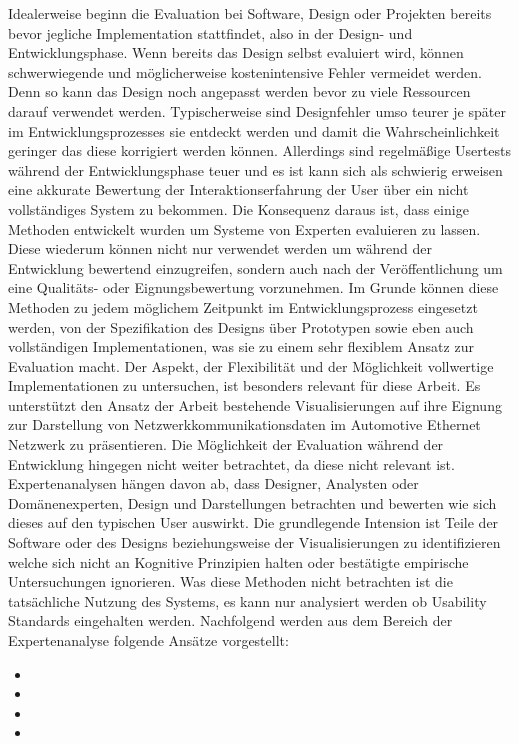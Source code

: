 \documentclass[draft=false
              ,paper=a4
              ,twoside=false
              ,fontsize=11pt
              ,headsepline
              ,BCOR10mm
              ,DIV11
              ]{scrbook}
\begin{document}
Idealerweise beginn die Evaluation bei Software, Design oder Projekten bereits bevor jegliche Implementation stattfindet, also in der Design- und Entwicklungsphase. Wenn bereits das Design selbst evaluiert wird, können schwerwiegende und möglicherweise kostenintensive Fehler vermeidet werden. Denn so kann das Design noch angepasst werden bevor zu viele Ressourcen darauf verwendet werden. Typischerweise sind Designfehler umso teurer je später im Entwicklungsprozesses sie entdeckt werden und damit die Wahrscheinlichkeit geringer das diese korrigiert werden können. Allerdings sind regelmäßige Usertests während der Entwicklungsphase teuer und es ist kann sich als schwierig erweisen eine akkurate Bewertung der Interaktionserfahrung der User über ein nicht vollständiges System zu bekommen. Die Konsequenz daraus ist, dass einige Methoden entwickelt wurden um Systeme von Experten evaluieren zu lassen. Diese wiederum können nicht nur verwendet werden um während der Entwicklung bewertend einzugreifen, sondern auch nach der Veröffentlichung um eine Qualitäts- oder Eignungsbewertung vorzunehmen. Im Grunde können diese Methoden zu jedem möglichem Zeitpunkt im Entwicklungsprozess eingesetzt werden, von der Spezifikation des Designs über Prototypen sowie eben auch vollständigen Implementationen, was sie zu einem sehr flexiblem Ansatz zur Evaluation macht. Der Aspekt, der Flexibilität und der Möglichkeit vollwertige Implementationen zu untersuchen, ist besonders relevant für diese Arbeit. Es unterstützt den Ansatz der Arbeit bestehende Visualisierungen auf ihre Eignung zur Darstellung von Netzwerkkommunikationsdaten im Automotive Ethernet Netzwerk zu präsentieren. Die Möglichkeit der Evaluation während der Entwicklung hingegen nicht weiter betrachtet, da diese nicht relevant ist. Expertenanalysen hängen davon ab, dass Designer, Analysten oder Domänenexperten, Design und Darstellungen betrachten und bewerten wie sich dieses auf den typischen User auswirkt. Die grundlegende Intension ist Teile der Software oder des Designs beziehungsweise der Visualisierungen zu identifizieren welche sich nicht an Kognitive Prinzipien halten oder bestätigte empirische Untersuchungen ignorieren. Was diese Methoden nicht betrachten ist die tatsächliche Nutzung des Systems, es kann nur analysiert werden ob Usability Standards eingehalten werden.
Nachfolgend werden aus dem Bereich der Expertenanalyse folgende Ansätze vorgestellt: 

\begin{itemize}
  \item {}
  \item {}
  \item {}
  \item {}
\end{itemize}
\end{document}

